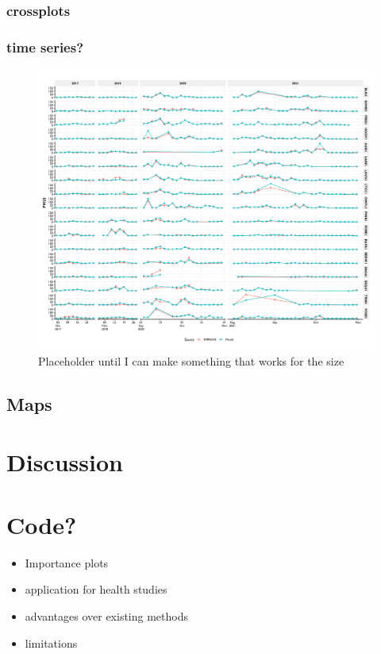 \documentclass[gmd, manuscript]{copernicus}
\providecommand{\tightlist}{%
  \setlength{\itemsep}{0pt}\setlength{\parskip}{0pt}}
\begin{document}
\subsubsection{crossplots}

\subsubsection{time series?}

\begin{figure}
\includegraphics[width=12cm]{./Figures/ImpTimeSeries} \caption{Placeholder until I can make something that works for the size}\label{fig:unnamed-chunk-4}
\end{figure}

\subsection{Maps}

\section{Discussion}

\section{Code?}

\begin{itemize}
\tightlist
\item
  Importance plots
\item
  application for health studies
\item
  advantages over existing methods
\item
  limitations
\end{itemize}
\end{document}
